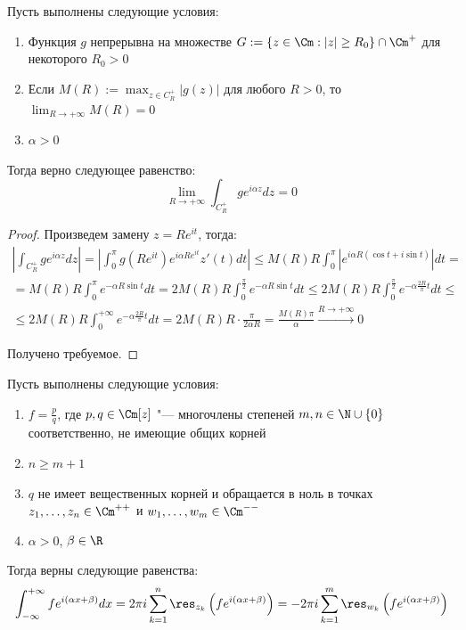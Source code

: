 \begin{proposition}
	Пусть выполнены следующие условия:
	\begin{enumerate}
		\item Функция $g$ непрерывна на множестве $G := \{z \in \Cm : |z| \ge R_0\} \cap \Cm^+$ для некоторого $R_0 > 0$
		\item Если $M(R) := \max_{z \in C_R^+}|g(z)|$ для любого $R>0$, то $\lim_{R \to +\infty}M(R) = 0$
		\item $\alpha > 0$
	\end{enumerate}
	
	Тогда верно следующее равенство:
	\[\lim_{R \to +\infty} \int_{C_R^+}ge^{i\alpha z}dz = 0\]
\end{proposition}

\begin{proof}
	Произведем замену $z = Re^{it}$, тогда:
	\begin{multline*}
		\left|\int_{C_R^+}ge^{i\alpha z}dz\right| = \left|\int_0^\pi g(Re^{it})e^{i\alpha Re^{it}}z'(t)dt\right| \le M(R)R \int_0^\pi \left|e^{i\alpha R(\cos{t} + i\sin{t})}\right|dt = \\
		= M(R)R \int_0^\pi e^{-\alpha R\sin{t}}dt = 2M(R)R \int_0^{\frac\pi 2} e^{-\alpha R\sin{t}}dt  \le 2M(R)R \int_0^{\frac\pi 2} e^{-\alpha \frac{2R}\pi t}dt \le \\
		\le 2M(R)R \int_0^{+\infty} e^{-\alpha \frac{2R}\pi t}dt = 2M(R)R \cdot \frac\pi{2\alpha R} = \frac{M(R)\pi}{\alpha} \xrightarrow{R \to +\infty} 0
	\end{multline*}
	
	Получено требуемое.
\end{proof}

\begin{theorem}
	Пусть выполнены следующие условия:
	\begin{enumerate}
		\item $f = \frac pq$, где $p, q \in \Cm[z]$ "--- многочлены степеней $m, n \in \N \cup \{0\}$ соответственно, не имеющие общих корней
		\item $n \ge m + 1$
		\item $q$ не имеет вещественных корней и обращается в ноль в точках $z_1, \dotsc, z_n \in \Cm^{++}$ и $w_1, \dotsc, w_m \in \Cm^{--}$
		\item $\alpha > 0$, $\beta \in \R$
	\end{enumerate}
	
	Тогда верны следующие равенства:
	\[\int_{-\infty}^{+\infty}fe^{i(\alpha x + \beta)}dx = 2\pi i\sum_{k=1}^n \res_{z_k}\left(fe^{i(\alpha x + \beta)}\right) = -2\pi i\sum_{k=1}^m \res_{w_k}\left(fe^{i(\alpha x + \beta)}\right)\]
\end{theorem}

